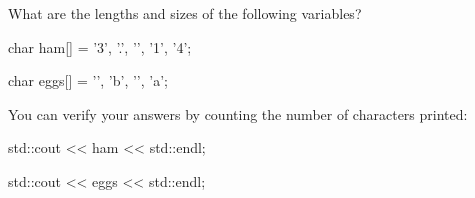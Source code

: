 What are the lengths and sizes of the following variables?

\begin{consolethree}[escapeinside=||]

char ham[] = {'3', '.', '\0', '1', '4'};

char eggs[] = {'\0', 'b', '\0', 'a'};

\end{consolethree}



You can verify your answers by counting the number of characters printed:

\begin{consolethree}[escapeinside=||]

std::cout << ham << std::endl;

std::cout << eggs << std::endl;

\end{consolethree}

